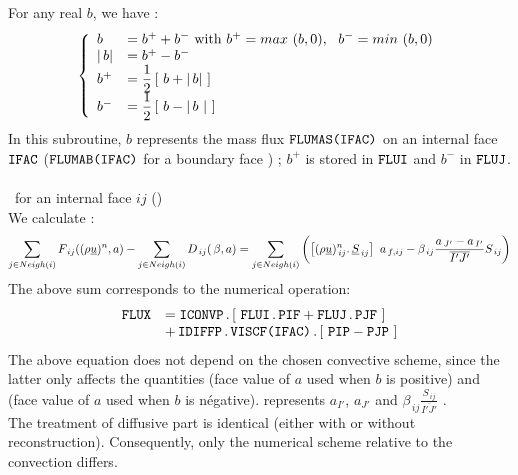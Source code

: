 For any real $b$, we have :
\begin{equation}\notag
\left\{\begin{array}{lll}
 b &= b^{+} + b^{-} \text{  with  } b^{+} = max\  (b,0),\ \ b^{-} = min\  (b,0)\\
|\,b |&= b^{+} - b^{-}\\
b^{+}& =\displaystyle\frac{1}{2}\,[\ b + |\,b |\ ]\\
b^{-}& =\displaystyle\frac{1}{2}\,[\ b - |\,b\ |\ ]\\
\end{array}\right.
\end{equation}
In this subroutine, $b$ represents the mass flux $\text{\texttt{FLUMAS(IFAC)}}$
on an internal face $\text{\texttt{IFAC}}$ ($\text{\texttt{FLUMAB(IFAC)}}$ for a boundary face )
; $b^{+}$ is stored in $\text{\texttt{FLUI}}$ and $b^{-}$ in $\text{\texttt{FLUJ}}$.\\\\
\hspace*{1cm}{\tiny$\blacksquare$}\, for an internal face $ij$ ()\\
We calculate :
\begin{equation}\notag
\sum_{j\in Neigh\left(i\right)}{F_{\,ij}((\rho \underline{u})^n, a)}
- \sum_{j\in Neigh\left(i\right)}{D_{\,ij}(\,\beta, a)}\\
= \sum_{j\in Neigh\left(i\right)}\displaystyle\left({ \left[{(\rho \underline{u})_{\,ij}^n} \text{.}\,
\underline{S}_{\,ij}\right]\ a_{\,f,ij}
- \beta_{\,ij}\frac{a_{\,J'}- a_{\,I'}}{\overline{I'J'}} S_{\,ij}}\right)
\end{equation}
The above sum corresponds to the numerical operation:
\begin{equation}\label{Base_Bilsc2_eq_flux_interne}
\begin{array}{ll}
\var{FLUX}& = \var{ICONVP} \,.\,[\ \var{FLUI}\,.\, \var{PIF} + \var{FLUJ}\,.\, \var{PJF}\ ]\\
&+\,\var{IDIFFP}\,.\,\var{VISCF(IFAC)}\,.\,[\ \var{PIP} - \var{PJP}\ ]
\end{array}
\end{equation}
The above equation does not depend on the chosen convective scheme, since the latter only affects the quantities   (face value of $a$ used
when $b$ is positive) and  (face value of $a$ used
when $b$ is n\'egative).  represents $a_{I'}$,  $a_{J'}$ and 
 $ \beta_{\,ij} \displaystyle \frac{S_{\,ij}}{\overline{I'J'}}$  .\\
The treatment of diffusive part is identical (either with or without reconstruction). Consequently, only the numerical scheme relative to the convection differs.\\\\
